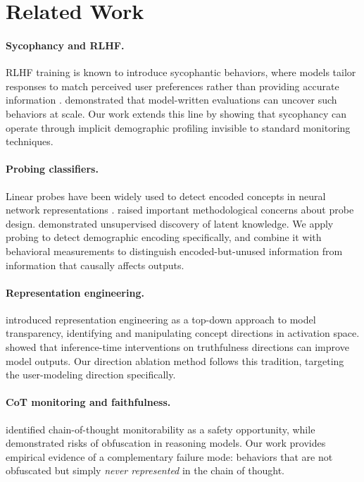 \documentclass[11pt]{article}
\begin{document}
\section{Related Work}
\label{sec:related}

\paragraph{Sycophancy and RLHF.}
RLHF training \citep{christiano2017deep, ouyang2022training} is known to introduce sycophantic behaviors, where models tailor responses to match perceived user preferences rather than providing accurate information \citep{sharma2024towards, casper2023open}. \citet{perez2022discovering} demonstrated that model-written evaluations can uncover such behaviors at scale. Our work extends this line by showing that sycophancy can operate through implicit demographic profiling invisible to standard monitoring techniques.

\paragraph{Probing classifiers.}
Linear probes have been widely used to detect encoded concepts in neural network representations \citep{alain2016understanding, belinkov2022probing}. \citet{hewitt2019designing} raised important methodological concerns about probe design. \citet{burns2022discovering} demonstrated unsupervised discovery of latent knowledge. We apply probing to detect demographic encoding specifically, and combine it with behavioral measurements to distinguish encoded-but-unused information from information that causally affects outputs.

\paragraph{Representation engineering.}
\citet{zou2023representation} introduced representation engineering as a top-down approach to model transparency, identifying and manipulating concept directions in activation space. \citet{li2024inference} showed that inference-time interventions on truthfulness directions can improve model outputs. Our direction ablation method follows this tradition, targeting the user-modeling direction specifically.

\paragraph{CoT monitoring and faithfulness.}
\citet{korbak2025cot} identified chain-of-thought monitorability as a safety opportunity, while \citet{baker2025monitoring} demonstrated risks of obfuscation in reasoning models. Our work provides empirical evidence of a complementary failure mode: behaviors that are not obfuscated but simply \emph{never represented} in the chain of thought.
\end{document}
